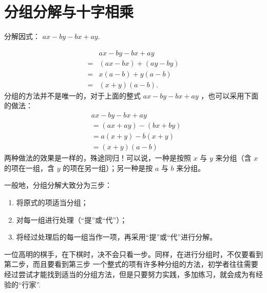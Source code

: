 \section{分组分解与十字相乘}
\begin{example}[分组分解三部曲]
	分解因式： $a x-b y-b x+a y .$
\end{example}
\begin{solution}
	\begin{align*}
		  & a x-b y-b x+a y     \\
		= & (a x-b x)+(a y-b y) \\
		= & x(a-b)+y(a-b)       \\
		= & (x+y)(a-b) .
	\end{align*}
	分组的方法并不是唯一的，对于上面的整式 $a x-b y-b x+a y$ ，也可以采用下面的做法：
	\begin{align*}
		 & a x-b y-b x+a y      \\
		 & =(a x+a y)-(b x+b y) \\
		 & =a(x+y)-b(x+y)       \\
		 & =(x+y)(a-b)
	\end{align*}
	两种做法的效果是一样的，殊途同归！可以说，一种是按照 $x$ 与 $y$ 来分组（含 $x$ 的项在一组，含 $y$ 的项在另一组）；另一种是按 $a$ 与 $b$ 来分组。
\end{solution}
一般地，分组分解大致分为三步：
\begin{enumerate}
	\item 将原式的项适当分组；
	\item 对每一组进行处理（“提”或“代”）；
	\item 将经过处理后的每一组当作一项，再采用“提”或“代”进行分解。
\end{enumerate}
一位高明的棋手，在下棋时，决不会只看一步。同样，在进行分组时，不仅要看到第二步，而且要看到第三步
一个整式的项有许多种分组的方法，初学者往往需要经过尝试才能找到适当的分组方法，但是只要努力实践，多加练习，就会成为有经验的“行家”.

